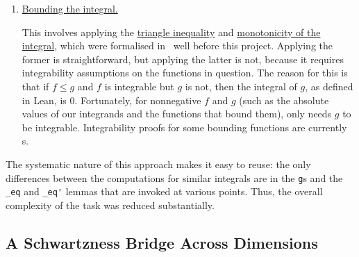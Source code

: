 \begin{enumerate}
    \item \underline{Bounding the integral.}

    This involves applying the \href{https://github.com/leanprover-community/mathlib4/blob/5a2eaa85c555c4263e15928cef249cbaad2eb2d2/Mathlib/MeasureTheory/Integral/Bochner/Basic.lean#L927}{triangle inequality} and \href{https://github.com/leanprover-community/mathlib4/blob/5a2eaa85c555c4263e15928cef249cbaad2eb2d2/Mathlib/MeasureTheory/Integral/Bochner/Set.lean#L645}{monotonicity of the integral}, which were formalised in \mathlib\ well before this project. Applying the former is straightforward, but applying the latter is not, because it requires integrability assumptions on the functions in question. The reason for this is that if $f \leq g$ and $f$ is integrable but $g$ is not, then the integral of $g$, as defined in Lean, is $0$. Fortunately, for nonnegative $f$ and $g$ (such as the absolute values of our integrands and the functions that bound them), only needs $g$ to be integrable. Integrability proofs for some bounding functions are currently \sorry s.
\end{enumerate}

The systematic nature of this approach makes it easy to reuse: the only differences between the computations for similar integrals are in the \lstinline|g|s and the \lstinline|_eq| and \lstinline|_eq'| lemmas that are invoked at various points. Thus, the overall complexity of the task was reduced substantially.

\subsection{A Schwartzness Bridge Across Dimensions}
\label{Ch5:Subsec:Schwartz_Bridge}



